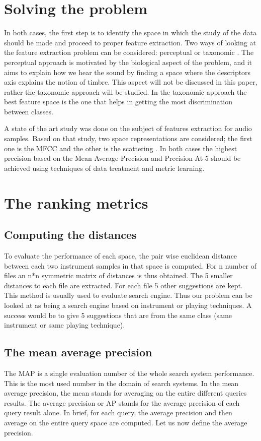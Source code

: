 \documentclass[hidelinks,12pt]{report}
\begin{document}
\section{Solving the problem}
In both cases, the first step is to identify the space in which the study of the data should be made and proceed to proper feature extraction. Two ways of looking at the feature extraction problem can be considered: perceptual or taxonomic \cite{P03}. The perceptual approach is motivated by the biological aspect of the problem, and it aims to explain how we hear the sound by finding a space where the descriptors axis explains the notion of timbre. This aspect will not be discussed in this paper, rather the taxonomic approach will be studied. In the taxonomic approach the best feature space is the one that helps in getting the most discrimination between classes.\par
A state of the art study was done on the subject of features extraction for audio samples. Based on that study, two space representations are considered; the first one is the MFCC and the other is the scattering \cite{AM11}. In both cases the highest precision based on the Mean-Average-Precision and Precision-At-5 should be achieved using techniques of data treatment and metric learning. 

\section{The ranking metrics}
\subsection{Computing the distances}
To evaluate the performance of each space, the pair wise euclidean distance between each two instrument samples in that space is computed. For n number of files an n*n symmetric matrix of distances is thus obtained. The 5 smaller distances to each file are extracted. For each file 5 other suggestions are kept. This method is usually used to evaluate search engine. Thus our problem can be looked at as being a search engine based on instrument or playing techniques. A success would be to give 5 suggestions that are from the same class (same instrument or same playing technique).
\subsection{The mean average precision}
The MAP is a single evaluation number of the whole search system performance. This is the most used number in the domain of search systems. In the mean average precision, the mean stands for averaging on the entire different queries results. The average precision or AP stands for the average precision of each query result alone. In brief, for each query, the average precision and then average on the entire query space are computed. Let us now define the average precision.
\end{document}
